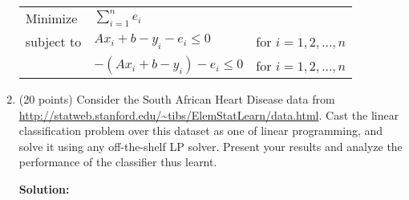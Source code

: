 \documentclass[11pt]{article}
\begin{document}
\begin{enumerate}
\begin{table}[h]
\begin{center}
\begin{tabular}{lll}
Minimize & $\sum\limits_{i=1}^n e_i$ & \\
subject to & $Ax_i + b - y_i - e_i \leq 0$ & for $i=1,2,\ldots,n$ \\
 & $-(Ax_i + b - y_i) - e_i \leq 0$ & for $i=1,2,\ldots,n$
\end{tabular}
\end{center}
\end{table}

\item (20 points) Consider the South African Heart Disease data from \url{http://statweb.stanford.edu/~tibs/ElemStatLearn/data.html}. Cast the linear classification problem over this dataset as one of linear programming, and solve it using any off-the-shelf LP solver. Present your results and analyze the performance of the classifier thus learnt.

\textbf{Solution:}

\end{enumerate}
\end{document}
